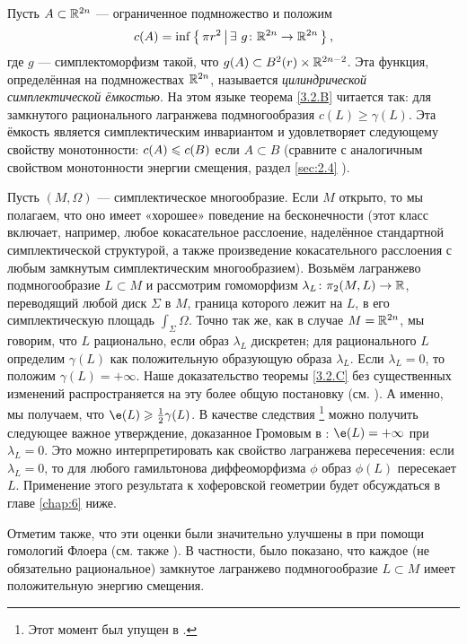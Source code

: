 \begin{ex}{}\label{3.2.F}
Пусть $A \subset \mathbb{R}^{2n}$ --- ограниченное подмножество и положим 
\[c(A) = \inf \left\{ \,{\pi r^2}\, \middle| \,{ \exists\  g\colon \mathbb{R}^{2n} \to \mathbb{R}^{2n}}\, \right\},\]
где $g$ --- симплектоморфизм такой, что $g (A) \subset B^2 (r) \times \mathbb{R}^{2n - 2}$.
Эта функция, определённая на подмножествах $\mathbb{R}^{2n}$, называется \emph{цилиндрической симплектической ёмкостью}.
На этом языке теорема \ref{3.2.B} читается так:
для замкнутого рационального лагранжева подмногообразия $c(L) \ge \gamma (L)$.
Эта ёмкость является симплектическим инвариантом и удовлетворяет следующему свойству монотонности:
$c (A) \z\le c (B)$ если $A \subset B$ (сравните с аналогичным свойством
монотонности энергии смещения, раздел \ref{sec:2.4} ).
\end{ex}



\begin{ex}{}\label{3.2.G}
Пусть $(M, \Omega)$ --- симплектическое многообразие.
Если $M$ открыто, то мы полагаем, что оно имеет «хорошее» поведение на
бесконечности (этот класс включает, например, любое кокасательное
расслоение, наделённое стандартной симплектической структурой, а также
произведение кокасательного расслоения с любым замкнутым
симплектическим многообразием). 
Возьмём лагранжево подмногообразие $L \subset M$ и рассмотрим
гомоморфизм $\lambda_L\colon \pi_2 (M, L) \to \mathbb{R}$, переводящий любой
диск $\Sigma$ в $M$, граница которого лежит на $L$, в его
симплектическую площадь $\int_\Sigma \Omega$. 
Точно так же, как в случае $M = \mathbb{R}^{2n}$, мы говорим, что $L$
рационально, если образ $\lambda_L$ дискретен; для рационального $L$
определим $\gamma (L)$ как положительную образующую образа
$\lambda_L$. 
Если $\lambda_L = 0$, то положим $\gamma (L) = + \infty$.
Наше доказательство теоремы \ref{3.2.C} без существенных изменений
распространяется на эту более общую постановку (см. \cite{P1}). 
А именно, мы получаем, что $\e (L) \ge \tfrac12 \gamma (L)$.
В качестве следствия%
\footnote{Этот момент был упущен в \cite[с. 359]{P1}.}
можно получить следующее важное утверждение, доказанное Громовым в \cite{G1}:
$\e (L) = + \infty$ при $\lambda_L = 0$.
Это можно интерпретировать как свойство лагранжева пересечения: если $\lambda_L = 0$, то  для любого гамильтонова диффеоморфизма $\phi$ образ $\phi (L)$ пересекает $L$.
Применение этого результата к хоферовской геометрии будет обсуждаться в главе \ref{chap:6} ниже.

Отметим также, что эти оценки были значительно улучшены в \cite{Ch} при помощи гомологий Флоера (см. также \cite{O3}).
В частности, было показано, что каждое (не обязательно рациональное) замкнутое лагранжево подмногообразие $L \subset M$ имеет положительную энергию смещения.
\end{ex}

